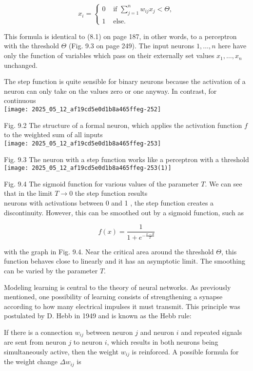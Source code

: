 \documentclass[10pt]{article}
\begin{document}
$$
x_{i}= \begin{cases}0 & \text { if } \sum_{j=1}^{n} w_{i j} x_{j}<\Theta, \\ 1 & \text { else. }\end{cases}
$$

This formula is identical to (8.1) on page 187, in other words, to a perceptron with the threshold $\Theta$ (Fig. 9.3 on page 249). The input neurons $1, \ldots, n$ here have only the function of variables which pass on their externally set values $x_{1}, \ldots, x_{n}$ unchanged.

The step function is quite sensible for binary neurons because the activation of a neuron can only take on the values zero or one anyway. In contrast, for continuous\\
\texttt{[image: 2025\_05\_12\_af19cd5e0d1b8a465ffeg-252]}

Fig. 9.2 The structure of a formal neuron, which applies the activation function $f$ to the weighted sum of all inputs\\
\texttt{[image: 2025\_05\_12\_af19cd5e0d1b8a465ffeg-253]}

Fig. 9.3 The neuron with a step function works like a perceptron with a threshold\\
\texttt{[image: 2025\_05\_12\_af19cd5e0d1b8a465ffeg-253(1)]}

Fig. 9.4 The sigmoid function for various values of the parameter $T$. We can see that in the limit $T \rightarrow 0$ the step function results\\
neurons with activations between 0 and 1 , the step function creates a discontinuity. However, this can be smoothed out by a sigmoid function, such as

$$
f(x)=\frac{1}{1+e^{-\frac{x-\theta}{T}}}
$$

with the graph in Fig. 9.4. Near the critical area around the threshold $\Theta$, this function behaves close to linearly and it has an asymptotic limit. The smoothing can be varied by the parameter $T$.

Modeling learning is central to the theory of neural networks. As previously mentioned, one possibility of learning consists of strengthening a synapse according to how many electrical impulses it must transmit. This principle was postulated by D. Hebb in 1949 and is known as the Hebb rule:

If there is a connection $w_{i j}$ between neuron $j$ and neuron $i$ and repeated signals are sent from neuron $j$ to neuron $i$, which results in both neurons being simultaneously active, then the weight $w_{i j}$ is reinforced. A possible formula for the weight change $\Delta w_{i j}$ is
\end{document}
